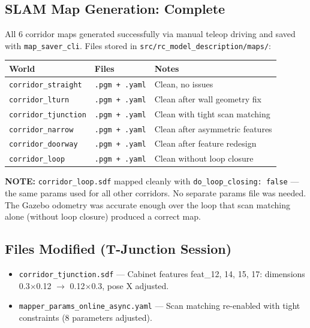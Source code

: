 \documentclass[11pt]{article}
\newcommand{\note}[1]{\textcolor{notblue}{\textbf{NOTE:} #1}}
\begin{document}
\subsection*{SLAM Map Generation: Complete}

All 6 corridor maps generated successfully via manual teleop driving and saved
with \texttt{map\_saver\_cli}. Files stored in
\texttt{src/rc\_model\_description/maps/}:

\begin{center}
\begin{tabular}{lll}
\textbf{World} & \textbf{Files} & \textbf{Notes} \\
\hline
\texttt{corridor\_straight} & \texttt{.pgm + .yaml} & Clean, no issues \\
\texttt{corridor\_lturn} & \texttt{.pgm + .yaml} & Clean after wall geometry fix \\
\texttt{corridor\_tjunction} & \texttt{.pgm + .yaml} & Clean with tight scan matching \\
\texttt{corridor\_narrow} & \texttt{.pgm + .yaml} & Clean after asymmetric features \\
\texttt{corridor\_doorway} & \texttt{.pgm + .yaml} & Clean after feature redesign \\
\texttt{corridor\_loop} & \texttt{.pgm + .yaml} & Clean without loop closure \\
\end{tabular}
\end{center}

\note{\texttt{corridor\_loop.sdf} mapped cleanly with \texttt{do\_loop\_closing:
false} --- the same params used for all other corridors. No separate params file
was needed. The Gazebo odometry was accurate enough over the loop that scan
matching alone (without loop closure) produced a correct map.}

\subsection*{Files Modified (T-Junction Session)}

\begin{itemize}
  \item \texttt{corridor\_tjunction.sdf} --- Cabinet features feat\_12, 14, 15,
    17: dimensions 0.3$\times$0.12 $\to$ 0.12$\times$0.3, pose X adjusted.
  \item \texttt{mapper\_params\_online\_async.yaml} --- Scan matching re-enabled
    with tight constraints (8 parameters adjusted).
\end{itemize}
\end{document}
